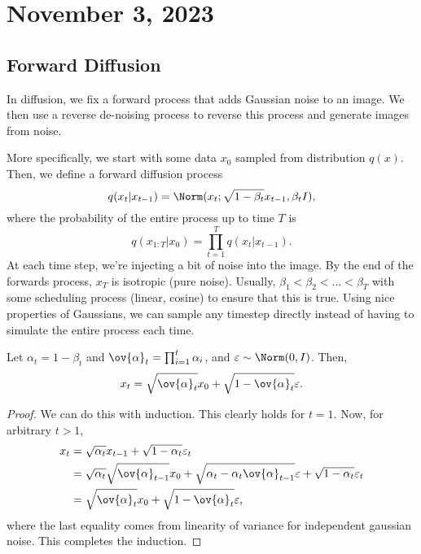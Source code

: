 \section{November 3, 2023}

\subsection{Forward Diffusion}

In diffusion, we fix a forward process that adds Gaussian noise to an image. We then use a reverse de-noising process to reverse this process and generate images from noise. 

More specifically, we start with some data $x_0$ sampled from distribution $q(x)$. Then, we define a forward diffusion process 
\[q(x_t|x_{t-1}) = \Norm(x_t; \sqrt{1-\beta_t}x_{t-1}, \beta_t I),\]
where the probability of the entire process up to time $T$ is 
\[q(x_{1:T}|x_0) = \prod_{t=1}^T q(x_t|x_{t-1}).\]
At each time step, we're injecting a bit of noise into the image. By the end of the forwards process, $x_T$ is isotropic (pure noise). Usually, $\beta_1 < \beta_2 <\hdots < \beta_T$ with some scheduling process (linear, cosine) to ensure that this is true. Using nice properties of Gaussians, we can sample any timestep directly instead of having to simulate the entire process each time. 

\begin{theorem}
\claimlabel

Let $\alpha_t = 1-\beta_t$ and $\ov{\alpha}_t = \prod_{i=1}^t \alpha_i$, and $\varepsilon\sim \Norm(0,I)$. Then, 
\[x_t = \sqrt{\ov{\alpha}_t} x_0 + \sqrt{1-\ov{\alpha}_t}\varepsilon.\] 
\end{theorem}

\begin{proof}
We can do this with induction. This clearly holds for $t=1$. Now, for arbitrary $t>1$, 
    \begin{align*}
        x_t &= \sqrt{\alpha_t}x_{t-1} + \sqrt{1-\alpha_t}\varepsilon_t \\
        &= \sqrt{\alpha_t}\sqrt{\ov{\alpha}_{t-1}}x_0 + \sqrt{\alpha_t - \alpha_t \ov{\alpha}_{t-1}}\varepsilon + \sqrt{1-\alpha_t}\varepsilon_t \\
        &= \sqrt{\ov{\alpha}_t}x_0 + \sqrt{1-\ov{\alpha}_t}\varepsilon,
    \end{align*}
    where the last equality comes from linearity of variance for independent gaussian noise. This completes the induction.   
\end{proof}

